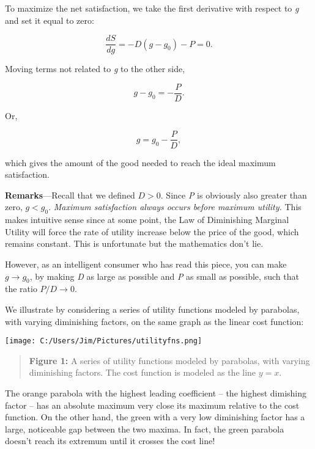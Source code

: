 \documentclass[11pt]{article}
\begin{document}
To maximize the net satisfaction, we take the first derivative with respect to \textit{g} and set it equal to zero:

\begin{equation}
	\frac{dS}{dg} = -D(g - g_0) - P = 0.
\end{equation}

Moving terms not related to \textit{g} to the other side,

\begin{equation}
	g - g_0 = -\frac{P}{D}.
\end{equation}

Or,

\begin{equation}
	g = g_0 - \frac{P}{D},
\end{equation}

which gives the amount of the good needed to reach the ideal maximum satisfaction.

\vspace{16pt}
\textbf{Remarks}---Recall that we defined $D > 0$. Since \textit{P} is obviously also greater than zero, $g < g_0$. \textit{Maximum satisfaction always occurs before maximum utility.}  This makes intuitive sense since at some point, the Law of Diminishing Marginal Utility will force the rate of utility increase below the price of the good, which remains constant. This is unfortunate but the mathematics don't lie.

However, as an intelligent consumer who has read this piece, you can make $g \rightarrow g_0$, by making \textit{D} as large as possible and \textit{P} as small as possible, such that the ratio $P/D \rightarrow 0$.

We illustrate by considering a series of utility functions modeled by parabolas, with varying diminishing factors, on the same graph as the linear cost function:

\begin{center}
	\texttt{[image: C:/Users/Jim/Pictures/utilityfns.png]}
	
\end{center}
\begin{quotation}
	\noindent \textbf{Figure 1:} A series of utility functions modeled by parabolas, with varying diminishing factors. The cost function is modeled as the line $y=x$.
\end{quotation}
The orange parabola with the highest leading coefficient -- the highest dimishing factor -- has an absolute maximum very close its maximum relative to the cost function. On the other hand, the green with a very low diminishing factor has a large, noticeable gap between the two maxima. In fact, the green parabola doesn't reach its extremum until it crosses the cost line!
\end{document}
